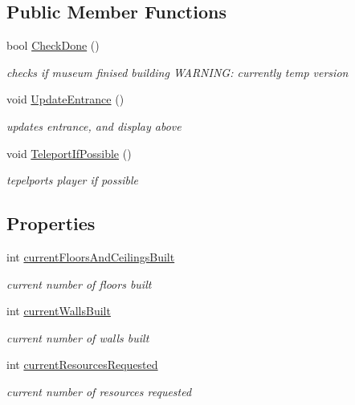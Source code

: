 \subsection*{Public Member Functions}
\begin{DoxyCompactItemize}
\item 
bool \mbox{\hyperlink{class_museum_build_observer_a44742cfdf94ae34a329e689e6995075e}{Check\+Done}} ()
\begin{DoxyCompactList}\small\item\em checks if museum finised building W\+A\+R\+N\+I\+NG\+: currently temp version \end{DoxyCompactList}\item 
void \mbox{\hyperlink{class_museum_build_observer_aa808cdf3870a709891e1dc4262c5aec1}{Update\+Entrance}} ()
\begin{DoxyCompactList}\small\item\em updates entrance, and display above \end{DoxyCompactList}\item 
void \mbox{\hyperlink{class_museum_build_observer_a506c7314ea2734e8f4881167ab5f2460}{Teleport\+If\+Possible}} ()
\begin{DoxyCompactList}\small\item\em tepelports player if possible \end{DoxyCompactList}\end{DoxyCompactItemize}
\subsection*{Properties}
\begin{DoxyCompactItemize}
\item 
int \mbox{\hyperlink{class_museum_build_observer_a36ee941b63f5ab4a0bf1f1b9a6df8cf7}{current\+Floors\+And\+Ceilings\+Built}}
\begin{DoxyCompactList}\small\item\em current number of floors built \end{DoxyCompactList}\item 
int \mbox{\hyperlink{class_museum_build_observer_a6f8eb9f119236ca8f3d657c6fe924407}{current\+Walls\+Built}}
\begin{DoxyCompactList}\small\item\em current number of walls built \end{DoxyCompactList}\item 
int \mbox{\hyperlink{class_museum_build_observer_a086380dcd30edbd12c4f7c0d4edcbf29}{current\+Resources\+Requested}}
\begin{DoxyCompactList}\small\item\em current number of resources requested \end{DoxyCompactList}\end{DoxyCompactItemize}
